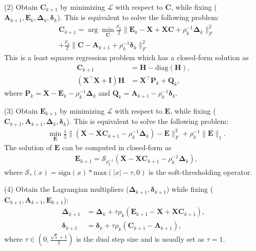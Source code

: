 \documentclass[10pt,twocolumn,letterpaper]{article}
\begin{document}
(2) Obtain $\bm{C}_{k+1}$ by minimizing $\mathcal{L}$ with respect to $\bm{C}$, while fixing ($\bm{A}_{k+1},\bm{E}_{k},\bm{\Delta}_{k},\bm{\delta}_{k}$). This is equivalent to solve the following problem:
\begin{equation}
\begin{split}
\label{e6}
&
\bm{C}_{k+1}
=
\arg\min_{\bm{C}}
\frac{\rho_{k}}{2}
\|
\bm{E}_{k}-\bm{X}+\bm{X}\bm{C}+\rho_{k}^{-1}\bm{\Delta}_{k}
\|_{F}^{2}
\\
&
+
\frac{\rho_{k}}{2}
\|
\bm{C}-\bm{A}_{k+1}+\rho_{k}^{-1}\bm{\delta}_{k}
\|_{F}^{2}
\end{split}
\end{equation}
This is a least squares regression problem which has a closed-form solution as 
\begin{equation}
\begin{split}
\label{e7}
\bm{C}_{k+1} 
&
=
\bm{H}-\text{diag}(\bm{H}),
\\
(\bm{X}^{\top}\bm{X}+\bm{I})\bm{H}
&
=
\bm{X}^{\top}\bm{P}_{k}+\bm{Q}_{k},
\end{split}
\end{equation}
where $\bm{P}_{k}=\bm{X}-\bm{E}_{k}-\rho_{k}^{-1}\bm{\Delta}_{k}$
and
$\bm{Q}_{k}=\bm{A}_{k+1}-\rho_{k}^{-1}\bm{\delta}_{k}$.

(3) Obtain $\bm{E}_{k+1}$ by minimizing $\mathcal{L}$ with respect to $\bm{E}$, while fixing ($\bm{C}_{k+1},\bm{A}_{k+1},\bm{\Delta}_{k},\bm{\delta}_{k}$). This is equivalent to solve the following problem:
\begin{equation}
\begin{split}
\label{e9}
&
\min_{\bm{E}}
\frac{1}{2}
\|
(\bm{X}-\bm{X}\bm{C}_{k+1}-\rho_{k}^{-1}\bm{\Delta}_{k})
-
\bm{E}
\|_{F}^{2}
+
\rho_{k}^{-1}
\|
\bm{E}
\|_{1}.
\end{split}
\end{equation}
The solution of $\bm{E}$ can be computed in closed-form as 
\begin{equation}
\begin{split}
\label{e10}
&
\bm{E}_{k+1}
=
\mathcal{S}_{\rho_{k}^{-1}}
(\bm{X}-\bm{X}\bm{C}_{k+1}-\rho_{k}^{-1}\bm{\Delta}_{k}),
\end{split}
\end{equation}
where $\mathcal{S}_{\tau}(x)=\text{sign}(x)*\text{max}(|x|-\tau,0)$ is the soft-thresholding operator.

(4) Obtain the Lagrangian multipliers ($\bm{\Delta}_{k+1},\bm{\delta}_{k+1}$) while fixing ($\bm{C}_{k+1},\bm{A}_{k+1},\bm{E}_{k+1}$):
\begin{equation}
\begin{split}
\label{e10}
\bm{\Delta}_{k+1}
&
=
\bm{\Delta}_{k}
+
\tau\rho_{k}
(\bm{E}_{k+1}-\bm{X}+\bm{X}\bm{C}_{k+1})
,
\\
\bm{\delta}_{k+1}
&
=
\bm{\delta}_{k}
+
\tau\rho_{k}
(\bm{C}_{k+1}-\bm{A}_{k+1})
,
\end{split}
\end{equation}
where $\tau\in(0,\frac{\sqrt{5}+1}{2})$ is the dual step size and is usually set as $\tau=1$.
\end{document}
